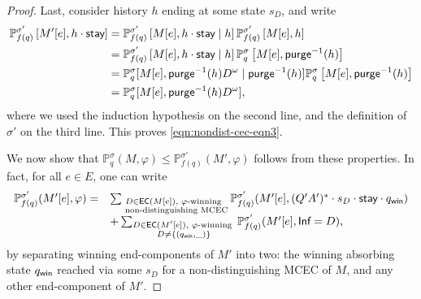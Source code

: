 \documentclass[a4paper,USenglish,cleveref, autoref, thm-restate]{lipics-v2021}
\newcommand*{\pr}{\mathbb{P}}
\newcommand\ecs{\textrm{\sf EC}}
\newcommand\Inf{\textrm{\sf Inf}}
\def\winabsorb{q_{\sf win}}
\newcommand\purgeinv[1]{\textrm{\sf purge}^{-1}(#1)}
\def\actionstay{\textrm{\sf stay}}
\begin{document}
\begin{proof}
  Last, consider history $h$ ending at some state $s_D$, and write 
  \begin{align*}
    \pr^{\sigma'}_{f(q)}\left[M'[e], h \cdot \actionstay \right] &= \pr^{\sigma'}_{f(q)}\left[M[e], h\cdot \actionstay \mid h\right]
          \pr^{\sigma'}_{f(q)}\left[M[e], h\right]\\
          &= \pr^{\sigma'}_{f(q)}\left[M[e], h\cdot \actionstay \mid h\right]
          \pr^\sigma_q\left[M[e], \purgeinv{h}\right]\\
          &= \pr_q^\sigma[M[e], \purgeinv{h} D^\omega \mid \purgeinv{h}]
          \pr^\sigma_q\left[M[e], \purgeinv{h}\right]\\
          &= \pr_q^\sigma[M[e], \purgeinv{h} D^\omega],
  \end{align*}
  where we used the induction hypothesis on the second line, and the definition of $\sigma'$ on  the third line.
  This proves \eqref{eqn:nondist-cec-eqn3}.

  \medskip
  We now show that $\pr_{q}^\sigma(M,\varphi) \leq \pr_{f(q)}^{\sigma'}(M',\varphi)$ follows from these properties.
  In fact, for all $e \in E$, one can write
  \begin{equation}
    \label{eqn:m-mp-final}
    \begin{array}{ll}
    \pr_{f(q)}^{\sigma'}(M'[e],\varphi) = &
    \sum_{\substack{D \in \ecs(M[e]), \text{ $\varphi$-winning }\\\text{ non-distinguishing MCEC}}} \pr_{f(q)}^{\sigma'}(M'[e],(Q'A')^*\cdot s_D \cdot \actionstay \cdot \winabsorb)
    \\
    &+\sum_{\substack{D \in \ecs(M'[e]), \text{ $\varphi$-winning } \\ D \neq \{(\winabsorb,\_)\} }}\pr_{f(q)}^{\sigma'}(M'[e],\Inf=D),
    \end{array}
  \end{equation}
  by separating winning end-components of $M'$ into two: the winning absorbing state $\winabsorb$ reached via some $s_D$ for a non-distinguishing MCEC of $M$, 
  and any other end-component of $M'$.


\end{proof}
\end{document}
